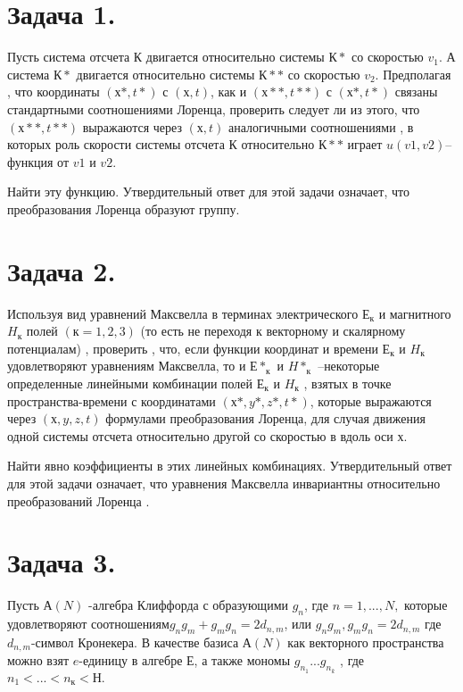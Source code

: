 \documentclass[12pt]{urticle}
\begin{document}
	
\section{Задача 1.} Пусть система отсчета $ К $ двигается относительно системы $ К* $ со скоростью $ v_1. $
          А система $ К* $ двигается относительно системы $ К** $ со скоростью $ v_2 $.
          Предполагая , что координаты $ (х*,t*) $ с  $ (х,t) $, как и  $ (х**,t**) $ с  $ (х*,t*) $ связаны
          стандартными соотношениями Лоренца, проверить следует ли из этого, 
          что  $ (х**,t**) $ выражаются через  $ (х,t) $ аналогичными соотношениями , 
          в которых роль скорости системы отсчета $ К $ относительно  $ К** $ играет 
         $  u(v1,v2) $--функция от $ v1 $ и $ v2 $.
          
          Найти эту функцию.
          Утвердительный ответ для этой задачи означает, 
          что преобразования Лоренца образуют группу.


\section{Задача 2.} Используя вид уравнений Максвелла в терминах электрического $ Е_к $ и магнитного $ H_к $ полей $( к=1,2,3) $
          (то есть не переходя к векторному и скалярному потенциалам) , проверить , что, если функции координат 
           и времени $ Е_к $  и $ H_к $    удовлетворяют уравнениям Максвелла, то и $ Е*_к $  и $ H*_к $ --некоторые  определенные 
           линейными  комбинации полей $ Е_к $  и $ H_к $ ,  взятых в точке пространства-времени  с координатами $ (х*,y*,z*,t*) $,
           которые выражаются через $ (х,y,z,t) $ формулами преобразования Лоренца, для случая движения одной системы 
           отсчета относительно другой со скоростью в вдоль оси х.
           
           Найти явно коэффициенты в этих линейных комбинациях.
           Утвердительный ответ для этой задачи означает, 
           что уравнения Максвелла инвариантны относительно 
           преобразований Лоренца .

\section{Задача 3. }Пусть $ А(N) $ -алгебра Клиффорда с образующими $ g_n $, где $ n=1,...,N, $
          которые удовлетворяют соотношениям$  g_ng_m+g_mg_n=2d_{n,m} $,
          или $ {g_ng_m,g_mg_n}=2d_{n,m} $ где $ d_{n,m} $-символ Кронекера.
          В качестве базиса $ А(N) $ как векторного пространства можно взят $ e $-единицу в алгебре $ Е $,
          а также мономы $ g_{n_1}...g_{n_k} $  , где $ n_1<...<n_к<Н. $
          
\end{document}
